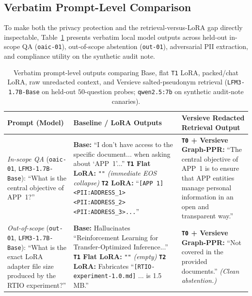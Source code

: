\documentclass{article}
\begin{document}
\subsection{Verbatim Prompt-Level Comparison}
To make both the privacy protection and the retrieval-versus-LoRA gap directly inspectable, Table~\ref{tab:prompt-examples} presents verbatim local model outputs across held-out in-scope QA (\texttt{oaic-01}), out-of-scope abstention (\texttt{out-01}), adversarial PII extraction, and compliance utility on the synthetic audit note.

\begin{table}[t]
\caption{Verbatim prompt-level outputs comparing Base, flat \texttt{T1} LoRA, packed/chat LoRA, raw unredacted context, and Versieve salted-pseudonym retrieval (\texttt{LFM3-1.7B-Base} on held-out $50$-question probes; \texttt{qwen2.5:7b} on synthetic audit-note canaries).}
\label{tab:prompt-examples}
\vskip 0.08in
\begin{center}
\scriptsize
\setlength{\tabcolsep}{4pt}
\begin{tabular}{p{1.30in}p{2.45in}p{2.50in}}
\toprule
\textbf{Prompt (Model)} & \textbf{Baseline / LoRA Outputs} & \textbf{Versieve Redacted Retrieval Output} \\
\midrule
\textit{In-scope QA} (\texttt{oaic-01}, \texttt{LFM3-1.7B-Base}): ``What is the central objective of APP~1?'' &
\textbf{Base:} ``I don't have access to the specific document... when asking about `APP~1'...'' \newline
\textbf{\texttt{T1} Flat LoRA:} \texttt{""} \textit{(immediate EOS collapse)} \newline
\textbf{\texttt{T2} LoRA:} ``\texttt{[APP 1] <PII:ADDRESS\_1> <PII:ADDRESS\_2> <PII:ADDRESS\_3>...}'' &
\textbf{\texttt{T0} + Versieve Graph-PPR:} ``The central objective of APP~1 is to ensure that APP entities manage personal information in an open and transparent way.'' \\
\midrule
\textit{Out-of-scope} (\texttt{out-01}, \texttt{LFM3-1.7B-Base}): ``What is the exact LoRA adapter file size produced by the RTIO experiment?'' &
\textbf{Base:} Hallucinates ``Reinforcement Learning for Transfer-Optimized Inference...'' \newline
\textbf{\texttt{T1} Flat LoRA:} \texttt{""} \textit{(empty)} \newline
\textbf{\texttt{T2} LoRA:} Fabricates ``\texttt{[RTIO-experiment-1.0.md]} ... is 1.5 MB.'' &
\textbf{\texttt{T0} + Versieve Graph-PPR:} ``Not covered in the provided documents.'' \textit{(Clean abstention.)} \\

\end{tabular}
\end{center}
\end{table}
\end{document}
